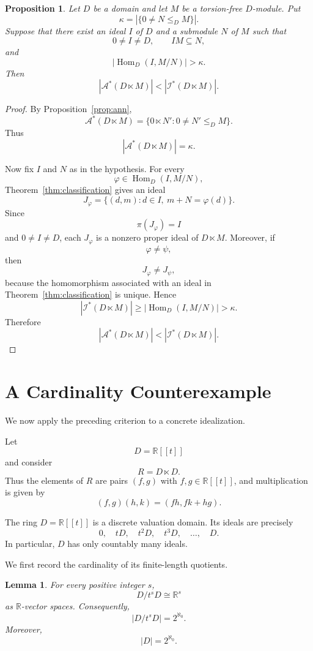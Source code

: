 \documentclass[11pt]{article}
\newtheorem{proposition}[theorem]{Proposition}
\newtheorem{lemma}[theorem]{Lemma}
\theoremstyle{definition}
\theoremstyle{remark}
\newcommand{\Hom}{\operatorname{Hom}}
\begin{document}
	\begin{proposition}
		\label{prop:criterion}
		Let $D$ be a domain and let $M$ be a torsion-free $D$-module. Put
		\[
		\kappa=
		\left|
		\{0\neq N\leq_D M\}
		\right|.
		\]
		Suppose that there exist an ideal $I$ of $D$ and a submodule $N$ of
		$M$ such that
		\[
		0\neq I\neq D,
		\qquad
		IM\subseteq N,
		\]
		and
		\[
		|\Hom_D(I,M/N)|>\kappa.
		\]
		Then
		\[
		|\mathcal A^*(D\ltimes M)|
		<
		|\mathcal I^*(D\ltimes M)|.
		\]
	\end{proposition}
	
	\begin{proof}
		By Proposition~\ref{prop:ann},
		\[
		\mathcal A^*(D\ltimes M)
		=
		\{0\ltimes N':0\neq N'\leq_D M\}.
		\]
		Thus
		\[
		|\mathcal A^*(D\ltimes M)|=\kappa.
		\]
		
		Now fix $I$ and $N$ as in the hypothesis. For every
		\[
		\varphi\in\Hom_D(I,M/N),
		\]
		Theorem~\ref{thm:classification} gives an ideal
		\[
		J_\varphi
		=
		\{(d,m):d\in I,\ m+N=\varphi(d)\}.
		\]
		Since
		\[
		\pi(J_\varphi)=I
		\]
		and $0\neq I\neq D$, each $J_\varphi$ is a nonzero proper ideal of
		$D\ltimes M$. Moreover, if
		\[
		\varphi\neq\psi,
		\]
		then
		\[
		J_\varphi\neq J_\psi,
		\]
		because the homomorphism associated with an ideal in
		Theorem~\ref{thm:classification} is unique. Hence
		\[
		|\mathcal I^*(D\ltimes M)|
		\geq
		|\Hom_D(I,M/N)|
		>
		\kappa.
		\]
		Therefore
		\[
		|\mathcal A^*(D\ltimes M)|
		<
		|\mathcal I^*(D\ltimes M)|.
		\]
	\end{proof}
	
	
	\section{A Cardinality Counterexample}
	
	We now apply the preceding criterion to a concrete idealization.
	
	Let
	\[
	D=\mathbb R[[t]]
	\]
	and consider
	\[
	R=D\ltimes D.
	\]
	Thus the elements of $R$ are pairs $(f,g)$ with
	$f,g\in\mathbb R[[t]]$, and multiplication is given by
	\[
	(f,g)(h,k)
	=
	(fh,fk+hg).
	\]
	
	The ring $D=\mathbb R[[t]]$ is a discrete valuation domain. Its ideals
	are precisely
	\[
	0,\quad tD,\quad t^2D,\quad t^3D,\quad\ldots,\quad D.
	\]
	In particular, $D$ has only countably many ideals.
	
	We first record the cardinality of its finite-length quotients.
	
	\begin{lemma}
		\label{lem:quotients}
		For every positive integer $s$,
		\[
		D/t^sD\cong\mathbb R^s
		\]
		as $\mathbb R$-vector spaces. Consequently,
		\[
		|D/t^sD|=2^{\aleph_0}.
		\]
		Moreover,
		\[
		|D|=2^{\aleph_0}.
		\]
	\end{lemma}
	
\end{document}
